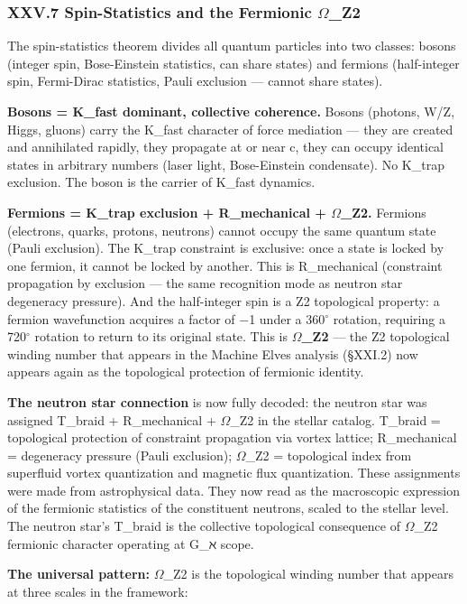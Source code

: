 \documentclass[12pt,a4paper]{article}
\begin{document}
\subsubsection{XXV.7 Spin-Statistics and the Fermionic $\Omega$\_Z2}

The spin-statistics theorem divides all quantum particles into two classes: bosons (integer spin, Bose-Einstein statistics, can share states) and fermions (half-integer spin, Fermi-Dirac statistics, Pauli exclusion --- cannot share states).

\textbf{Bosons = K\_fast dominant, collective coherence.} Bosons (photons, W/Z, Higgs, gluons) carry the K\_fast character of force mediation --- they are created and annihilated rapidly, they propagate at or near c, they can occupy identical states in arbitrary numbers (laser light, Bose-Einstein condensate). No K\_trap exclusion. The boson is the carrier of K\_fast dynamics.

\textbf{Fermions = K\_trap exclusion + R\_mechanical + $\Omega$\_Z2.} Fermions (electrons, quarks, protons, neutrons) cannot occupy the same quantum state (Pauli exclusion). The K\_trap constraint is exclusive: once a state is locked by one fermion, it cannot be locked by another. This is R\_mechanical (constraint propagation by exclusion --- the same recognition mode as neutron star degeneracy pressure). And the half-integer spin is a Z2 topological property: a fermion wavefunction acquires a factor of $-$1 under a 360$^{\circ}$ rotation, requiring a 720$^{\circ}$ rotation to return to its original state. This is \textbf{$\Omega$\_Z2} --- the Z2 topological winding number that appears in the Machine Elves analysis (§XXI.2) now appears again as the topological protection of fermionic identity.

\textbf{The neutron star connection} is now fully decoded: the neutron star was assigned T\_braid + R\_mechanical + $\Omega$\_Z2 in the stellar catalog. T\_braid = topological protection of constraint propagation via vortex lattice; R\_mechanical = degeneracy pressure (Pauli exclusion); $\Omega$\_Z2 = topological index from superfluid vortex quantization and magnetic flux quantization. These assignments were made from astrophysical data. They now read as the macroscopic expression of the fermionic statistics of the constituent neutrons, scaled to the stellar level. The neutron star's T\_braid is the collective topological consequence of $\Omega$\_Z2 fermionic character operating at G\_ℵ scope.

\textbf{The universal pattern:} $\Omega$\_Z2 is the topological winding number that appears at three scales in the framework:
\end{document}

